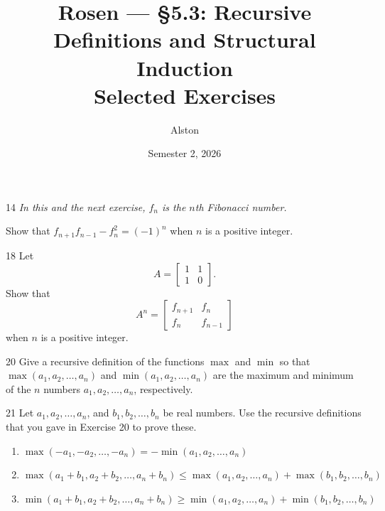 \documentclass[11pt]{article}
\title{Rosen --- \S 5.3: Recursive Definitions and Structural Induction\\ \large Selected Exercises}
\author{Alston}
\date{Semester 2, 2026}
\begin{document}
\maketitle

\begin{exercise}{14}
    \textit{In this and the next exercise, $f_n$ is the $n$th
    Fibonacci number.}

    Show that $f_{n+1} f_{n-1} - f_n^2 = (-1)^n$ when $n$ is a
    positive integer.
\end{exercise}

\begin{exercise}{18}
    Let
    \[
    A = \begin{bmatrix} 1 & 1 \\ 1 & 0 \end{bmatrix}.
    \]
    Show that
    \[
    A^n = \begin{bmatrix} f_{n+1} & f_n \\ f_n & f_{n-1} \end{bmatrix}
    \]
    when $n$ is a positive integer.
\end{exercise}

\begin{exercise}{20}
    Give a recursive definition of the functions $\max$ and $\min$ so
    that $\max(a_1, a_2, \dots, a_n)$ and $\min(a_1, a_2, \dots, a_n)$
    are the maximum and minimum of the $n$ numbers
    $a_1, a_2, \dots, a_n$, respectively.
\end{exercise}

\begin{exercise}{21}
    Let $a_1, a_2, \dots, a_n$, and $b_1, b_2, \dots, b_n$ be real
    numbers. Use the recursive definitions that you gave in Exercise
    20 to prove these.
    \begin{enumerate}[label=(\alph*)]
        \item $\max(-a_1, -a_2, \dots, -a_n) = -\min(a_1, a_2, \dots,
        a_n)$
        \item $\max(a_1+b_1, a_2+b_2, \dots, a_n+b_n) \leq
        \max(a_1, a_2, \dots, a_n) + \max(b_1, b_2, \dots, b_n)$
        \item $\min(a_1+b_1, a_2+b_2, \dots, a_n+b_n) \geq
        \min(a_1, a_2, \dots, a_n) + \min(b_1, b_2, \dots, b_n)$
    \end{enumerate}
\end{exercise}
\end{document}
